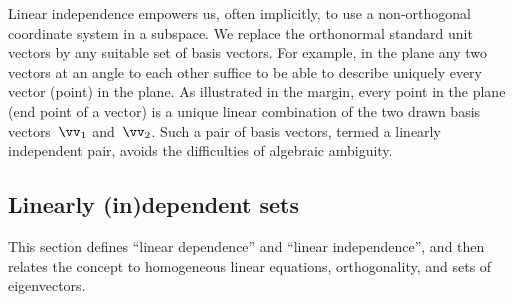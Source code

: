 Linear independence empowers us, often implicitly, to use a non-orthogonal coordinate system in a subspace.
We replace the orthonormal standard unit vectors by any suitable set of basis vectors.
%
For example, in the plane any two vectors at an angle to each other suffice to be able to describe uniquely every vector (point) in the plane.
As illustrated in the margin, every point in the plane (end point of a vector) is a unique linear combination of the two drawn basis vectors~\(\vv_1\) and~\(\vv_2\).
Such a pair of basis vectors, termed a linearly independent pair, avoids the  difficulties of algebraic ambiguity.



\subsection{Linearly (in)dependent sets}

This section defines ``linear dependence'' and ``linear independence'', and then relates the concept to homogeneous linear equations, orthogonality, and sets of eigenvectors.

